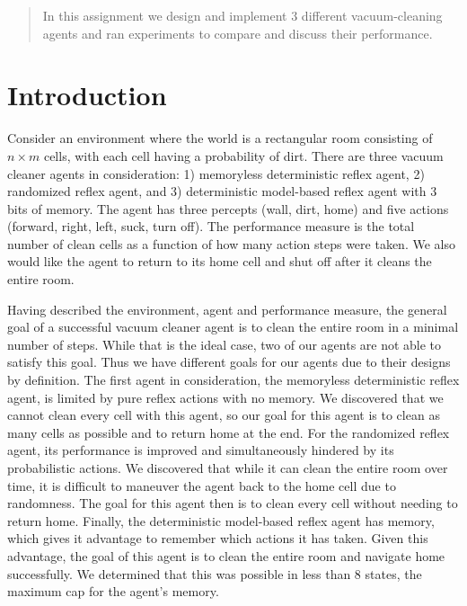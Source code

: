 \documentclass[12pt]{article}
\begin{document}
\maketitle

\begin{abstract}
In this assignment we design and implement 3 different vacuum-cleaning agents and ran experiments to compare and discuss their performance.
\end{abstract}

\section{Introduction}

Consider an environment where the world is a rectangular room consisting of $ n \times m $ cells, with each cell having a probability of dirt. There are three vacuum cleaner agents in consideration: 1) memoryless deterministic reflex agent, 2) randomized reflex agent, and 3) deterministic model-based reflex agent with 3 bits of memory. The agent has three percepts (wall, dirt, home) and five actions (forward, right, left, suck, turn off). The performance measure is the total number of clean cells as a function of how many action steps were taken. We also would like the agent to return to its home cell and shut off after it cleans the entire room.

Having described the environment, agent and performance measure, the general goal of a successful vacuum cleaner agent is to clean the entire room in a minimal number of steps. While that is the ideal case, two of our agents are not able to satisfy this goal. Thus we have different goals for our agents due to their designs by definition. The first agent in consideration, the memoryless deterministic reflex agent, is limited by pure reflex actions with no memory. We discovered that we cannot clean every cell with this agent, so our goal for this agent is to clean as many cells as possible and to return home at the end. For the randomized reflex agent, its performance is improved and simultaneously hindered by its probabilistic actions. We discovered that while it can clean the entire room over time, it is difficult to maneuver the agent back to the home cell due to randomness. The goal for this agent then is to clean every cell without needing to return home. Finally, the deterministic model-based reflex agent has memory, which gives it advantage to remember which actions it has taken. Given this advantage, the goal of this agent is to clean the entire room and navigate home successfully. We determined that this was possible in less than 8 states, the maximum cap for the agent's memory.
\end{document}
